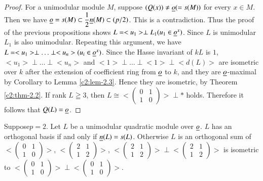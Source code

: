 \begin{proof}
For a unimodular module $M$, suppose $(Q(x))\neq \underline{o}(=s(M))$ for
every $x\in M$. Then we have $\underline{o}=s(M)\subset
\dfrac{1}{2}\underline{n}(M)\subset (p/2)$. This is a contradiction. Thus the
proof of the previous propositions shows $L=<u_{1}>\perp
L_{1}(u_{1}\in\underline{o}^{x})$. Since $L$ is unimodular $L_{1}$ is also
unimodular. Repeating this argument, we have
$L=<u_{1}>\perp\ldots\perp <u_{n}>(u_{i}\in\underline{o}^{x})$. Since the
Hasse invariant of $kL$ is $1$, $<u_{1}>\perp\ldots\perp <u_{n}>$ and
$<1>\perp\ldots\perp<1>\perp <d(L)>$ are isometric over $k$ after the
extension of coefficient ring from $\underline{o}$ to $k$, and they are
$\underline{o}$-maximal by Corollary to Lemma \ref{c2:lem-2.3}. Hence they are
isometric, by Theorem \ref{c2:thm-2.2}. If rank $L\geqq 3$, then $L\cong
<\left(\begin{smallmatrix} 0 & 1\\ 1 & 0\end{smallmatrix}\right)>\perp
  \ast$ holds. Therefore it follows that $Q(L)=\underline{o}$. 
\end{proof}

\begin{prop}\label{c2:prop-2.13}
Suppose\pageoriginale $p=2$. Let $L$ be a unimodular quadratic module
over $\underline{o}$. $L$ has an orthogonal basis if and only if
$\underline{n}(L)=s(L)$. Otherwise $L$ is an orthogonal sum of
$<\left(\begin{smallmatrix} 0 & 1\\ 1 & 0\end{smallmatrix}\right)>$,
  $<\left(\begin{smallmatrix} 2 & 1\\ 1 &
    2 \end{smallmatrix}\right)>$, $<\left(\begin{smallmatrix} 2 &
    1\\ 1 & 2\end{smallmatrix}\right)>\perp <\left(\begin{smallmatrix}
      2 & 1\\ 1 & 2    \end{smallmatrix}\right)>$ is isometric to
    $<\left(\begin{smallmatrix} 0 & 1\\ 1 & 0
    \end{smallmatrix}\right)>\perp <\left(\begin{smallmatrix} 0 &
      1\\ 1 & 0    \end{smallmatrix}\right)>$.
\end{prop}

